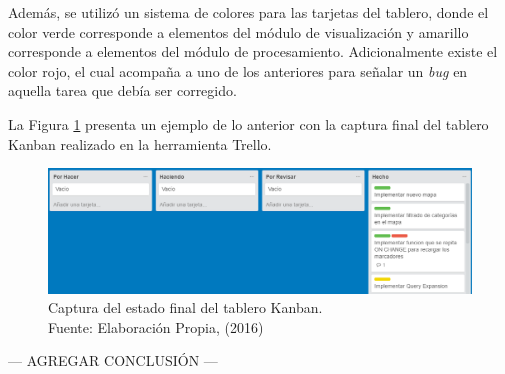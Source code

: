 Además, se utilizó un sistema de colores para las tarjetas del tablero, donde el color verde corresponde a elementos del módulo de visualización y amarillo corresponde a elementos del módulo de procesamiento. Adicionalmente existe el color rojo, el cual acompaña a uno de los anteriores para señalar un \textit{bug} en aquella tarea que debía ser corregido. 

La Figura \ref{fig:trello} presenta un ejemplo de lo anterior con la captura final del tablero Kanban realizado en la herramienta Trello.

\begin{figure}[H]
	\centering
	\captionsetup{justification=centering}
	\includegraphics[scale=0.5]{images/Trello.png}
	\caption[Captura del estado final del tablero Kanban.]{Captura del estado final del tablero Kanban.\\Fuente: Elaboración Propia, (2016)}
	\label{fig:trello}
\end{figure}

--- AGREGAR CONCLUSIÓN ---